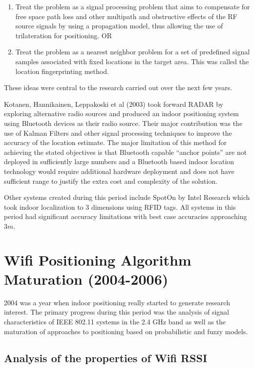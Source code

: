 \begin{enumerate}
\item Treat the problem as a signal processing problem that aims to compensate for free space path loss and other multipath and obstructive effects of the RF source signals by using a propagation model, thus allowing the use of trilateration for positioning. OR
\item Treat the problem as a nearest neighbor problem for a set of predefined signal samples associated with fixed locations in the target area. This was called the location fingerprinting method.
\end{enumerate}

These ideas were central to the research carried out over the next few years.

Kotanen, Hannikainen, Leppakoski et al\cite{Kotanen} (2003) took forward RADAR by exploring alternative radio sources and produced an indoor positioning system using Bluetooth devices as their radio source. Their major contribution was the use of Kalman Filters and other signal processing techniques to improve the accuracy of the location estimate. The major limitation of this method for achieving the stated objectives is that Bluetooth capable “anchor points” are not deployed in sufficiently large numbers and a Bluetooth based indoor location technology would require additional hardware deployment and does not have sufficient range to justify the extra cost and complexity of the solution.

Other systems created during this period include SpotOn\cite{SpotON} by Intel Research which took indoor localization to 3 dimensions using RFID tags. All systems in this period had significant accuracy limitations with best case accuracies 
approaching $3 m$.

\section{Wifi Positioning Algorithm Maturation (2004-2006)}

2004 was a year when indoor positioning really started to generate research interest. The primary progress during this period was the analysis of signal characteristics of IEEE 802.11 systems in the 2.4 GHz band as well as the maturation of approaches to positioning based on probabilistic and fuzzy models.

\subsection{Analysis of the properties of Wifi RSSI}

